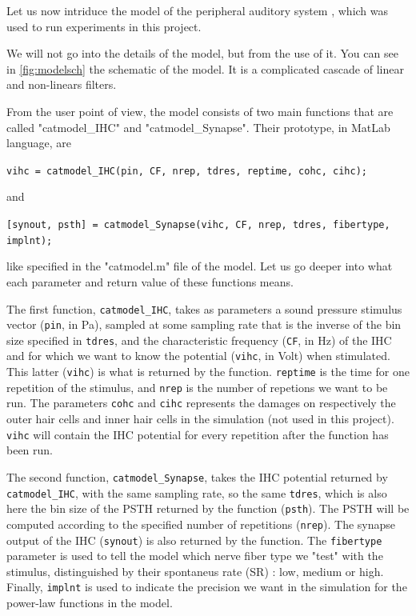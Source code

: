 Let us now intriduce the model of the peripheral auditory system
\cite{Model1, Model2, Model3}, which was used to run experiments in this project. 

We will not go into the details of the model, but from the use of it. 
You can see in \autoref{fig:modelsch} the schematic of the model.
It is a complicated cascade of linear and non-linears filters.



From the user point of view, the model consists of two main functions 
that are called "catmodel\_IHC" and "catmodel\_Synapse".
 Their prototype, in MatLab language, are

\texttt{vihc = catmodel\_IHC(pin, CF, nrep, tdres, reptime, cohc, cihc);}

and

\texttt{[synout, psth] = catmodel\_Synapse(vihc, CF, nrep, tdres, fibertype, implnt);}

like specified in the "catmodel.m" file of the model. 
Let us go deeper into what each parameter and return value of these functions means.

The first function, \texttt{catmodel\_IHC}, takes as parameters 
a sound pressure stimulus vector (\texttt{pin}, in Pa), sampled at some sampling rate 
that is the inverse of the bin size specified in \texttt{tdres}, and 
the characteristic frequency (\texttt{CF}, in Hz) 
of the IHC and for which we want to know the potential 
(\texttt{vihc}, in Volt) when stimulated. 
This latter (\texttt{vihc}) is what is returned by the function. 
\texttt{reptime} is the time for one repetition of the stimulus, 
and \texttt{nrep} is the number of repetions we want to be run. 
The parameters \texttt{cohc} and \texttt{cihc} represents the damages on respectively 
the outer hair cells and inner hair cells in the simulation (not used in this project).
\texttt{vihc} will contain the IHC potential for every repetition 
after the function has been run.

The second function, \texttt{catmodel\_Synapse}, 
takes the IHC potential returned by \texttt{catmodel\_IHC}, 
with the same sampling rate, so the same \texttt{tdres}, which is also here the bin size
of the PSTH returned by the function (\texttt{psth}). 
The PSTH will be computed according to the specified number of repetitions (\texttt{nrep}).
The synapse output of the IHC (\texttt{synout}) is also returned by the function.
The \texttt{fibertype} parameter is used to tell the model which nerve fiber type
we "test" with the stimulus, distinguished by their spontaneus rate (SR) : 
low, medium or high. 
Finally, \texttt{implnt} is used to indicate the precision we want in the simulation 
for the power-law functions in the model.

